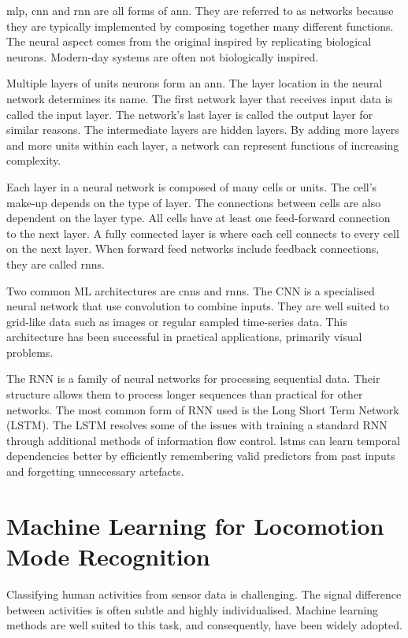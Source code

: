 \acrshort{mlp}, \acrshort{cnn} and \acrshort{rnn} are all forms of \acrfull{ann}. They are referred to as networks because they are typically implemented by composing together many different functions. The neural aspect comes from the original inspired by replicating biological neurons. Modern-day systems are often not biologically inspired.

Multiple layers of units neurons form an \acrshort{ann}. The layer location in the neural network determines its name. The first network layer that receives input data is called the input layer. The network's last layer is called the output layer for similar reasons. The intermediate layers are hidden layers. By adding more layers and more units within each layer, a network can represent functions of increasing complexity\cite{Goodfellow2015}.

Each layer in a neural network is composed of many cells or units. The cell's make-up depends on the type of layer. The connections between cells are also dependent on the layer type. All cells have at least one feed-forward connection to the next layer. A fully connected layer is where each cell connects to every cell on the next layer. When forward feed networks include feedback connections, they are called \acrshort{rnn}s.

Two common ML architectures are \acrshort{cnn}s and \acrshort{rnn}s. The CNN is a specialised neural network that use convolution to combine inputs. They are well suited to grid-like data such as images or regular sampled time-series data. This architecture has been successful in practical applications, primarily visual problems.\cite{Goodfellow2015}

The RNN is a family of neural networks for processing sequential data. Their structure allows them to process longer sequences than practical for other networks.\cite{Goodfellow2015} The most common form of RNN used is the Long Short Term Network (LSTM). The LSTM resolves some of the issues with training a standard RNN through additional methods of information flow control\cite{Hochreiter1997}. \acrshort{lstm}s can learn temporal dependencies better by efficiently remembering valid predictors from past inputs and forgetting unnecessary artefacts\cite{Hernandez2021}.



\section{Machine Learning for Locomotion Mode Recognition}
\label{sec:background-ml-lmr}
Classifying human activities from sensor data is challenging. The signal difference between activities is often subtle and highly individualised.\cite{Zhu2019} Machine learning methods are well suited to this task, and consequently, have been widely adopted\cite{Wang2019b}.

